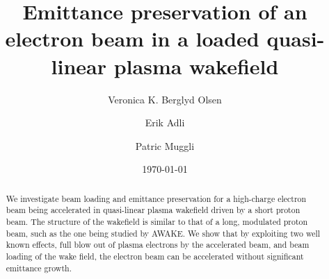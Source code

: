 \documentclass[aps,prstab,reprint,amsmath,amssymb,groupedaddress]{revtex4-1}
\begin{document}


\title{Emittance preservation of an electron beam in a loaded quasi-linear plasma wakefield}

\author{Veronica K. Berglyd Olsen}

\author{Erik Adli}

\author{Patric Muggli}

\date{\today}

\begin{abstract}
We investigate beam loading and emittance preservation for a high-charge electron beam being accelerated in quasi-linear
plasma wakefield driven by a short proton beam. The structure of the wakefield is similar to that of a long, modulated
proton beam, such as the one being studied by AWAKE.  We show that by exploiting two well known effects, full blow out
of plasma electrons by the accelerated beam, and beam loading of the wake field, the electron beam can be accelerated
without significant emittance growth.
\end{abstract}

\maketitle
\end{document}
